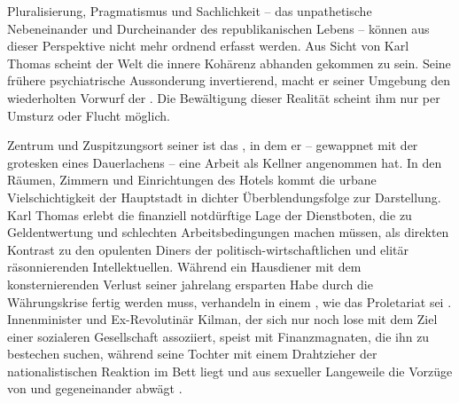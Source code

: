 Pluralisierung, Pragmatismus und Sachlichkeit -- das unpathetische
Nebeneinander und Durcheinander des republikanischen Lebens -- können aus
dieser  Perspektive nicht mehr ordnend erfasst
werden. Aus Sicht von Karl Thomas scheint der Welt die innere Kohärenz
abhanden gekommen zu sein. Seine frühere psychiatrische
Aussonderung invertierend, macht er seiner Umgebung den wiederholten Vorwurf der
.  
Die Bewältigung dieser Realität scheint ihm nur per Umsturz oder Flucht
möglich.

Zentrum und Zuspitzungsort seiner  ist das
\Cite{Grand Hotel}, in dem er -- gewappnet mit der grotesken \Cite{Fassade}
eines Dauerlachens  
-- eine Arbeit als Kellner angenommen hat. In den Räumen, Zimmern und
Einrichtungen des Hotels kommt die urbane Vielschichtigkeit der Hauptstadt in
dichter Überblendungsfolge zur Darstellung. Karl Thomas erlebt die finanziell
notdürftige Lage der Dienstboten, die zu Geldentwertung und schlechten
Arbeitsbedingungen  machen müssen, als direkten Kontrast zu
den opulenten Diners der politisch-wirtschaftlichen  und elitär
räsonnierenden Intellektuellen. Während ein Hausdiener mit dem
konsternierenden Verlust seiner jahrelang ersparten Habe durch die
Währungskrise fertig werden muss,  
verhandeln \Cite{geistige Kopfarbeiter} in einem \Cite{Klubzimmer}, wie das
Proletariat \Cite{geistig zu erlösen} sei .
Innenminister und Ex-Revolutinär Kilman, der sich nur noch lose mit dem Ziel
einer sozialeren Gesellschaft assoziiert, speist mit Finanzmagnaten, die ihn
zu bestechen suchen, während seine Tochter mit einem Drahtzieher der
nationalistischen Reaktion im Bett liegt und aus sexueller Langeweile die
Vorzüge von \Cite{Koks} und \Cite{Cordon rouge} gegeneinander abwägt
.

